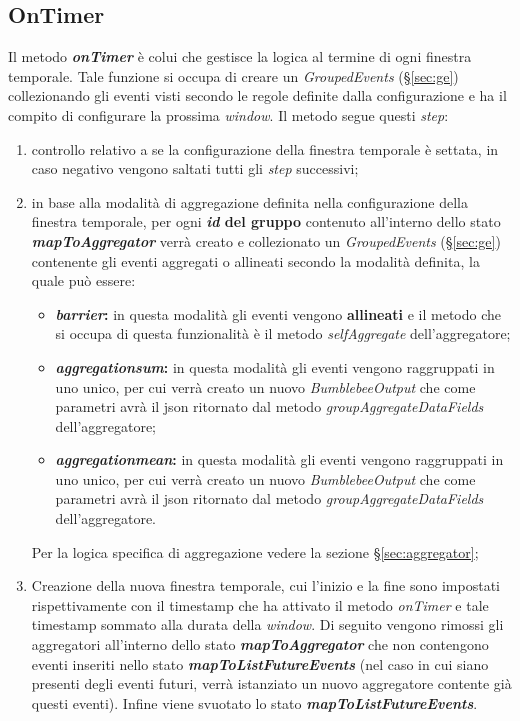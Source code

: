 \subsection{OnTimer}\label{sec:on-timer-windowing}
Il metodo \textbf{\textit{onTimer}} è colui che gestisce la logica al termine di ogni finestra temporale. Tale funzione si occupa di creare un \textit{GroupedEvents} (\S\ref{sec:ge}) collezionando gli eventi visti secondo le regole definite dalla configurazione e ha il compito di configurare la prossima \textit{window}. Il metodo segue questi \textit{step}:
\begin{enumerate}
	\item{controllo relativo a se la configurazione della finestra temporale è settata, in caso negativo vengono saltati tutti gli \textit{step} successivi;}
	\item{in base alla modalità di aggregazione definita nella configurazione della finestra temporale, per ogni \textbf{\textit{id} del gruppo} contenuto all'interno dello stato \textbf{\textit{mapToAggregator}} verrà creato e collezionato un \textit{GroupedEvents} (\S\ref{sec:ge}) contenente gli eventi aggregati o allineati secondo la modalità definita, la quale può essere:
	\begin{itemize}
		\item{\textbf{\textit{barrier}:} in questa modalità gli eventi vengono \textbf{allineati} e il metodo che si occupa di questa funzionalità è il metodo \textit{selfAggregate} dell'aggregatore;}
		\item{\textbf{\textit{aggregation\textunderscore sum}:} in questa modalità gli eventi vengono raggruppati in uno unico, per cui verrà creato un nuovo \textit{BumblebeeOutput} che come parametri avrà il \gls{json} ritornato dal metodo \textit{groupAggregateDataFields} dell'aggregatore;}
		\item{\textbf{\textit{aggregation\textunderscore mean}:} in questa modalità gli eventi vengono raggruppati in uno unico, per cui verrà creato un nuovo \textit{BumblebeeOutput} che come parametri avrà il \gls{json} ritornato dal metodo \textit{groupAggregateDataFields} dell'aggregatore.}
	\end{itemize}
	Per la logica specifica di aggregazione vedere la sezione \S\ref{sec:aggregator};}
	\item{Creazione della nuova finestra temporale, cui l'inizio e la fine sono impostati rispettivamente con il \gls{timestamp} che ha attivato il metodo \textit{onTimer} e tale \gls{timestamp} sommato alla durata della \textit{window}. Di seguito vengono rimossi gli aggregatori all'interno dello stato \textbf{\textit{mapToAggregator}} che non contengono eventi inseriti nello stato \textbf{\textit{mapToListFutureEvents}} (nel caso in cui siano presenti degli eventi futuri, verrà istanziato un nuovo aggregatore contente già questi eventi). Infine viene svuotato lo stato \textbf{\textit{mapToListFutureEvents}}.
	}
\end{enumerate}

